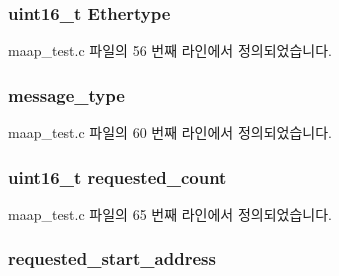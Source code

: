 \subsubsection[{\texorpdfstring{Ethertype}{Ethertype}}]{\setlength{\rightskip}{0pt plus 5cm}uint16\+\_\+t Ethertype}\hypertarget{structmaap__packet_a1a9102ebc02a8e42299ec477781088cd}{}\label{structmaap__packet_a1a9102ebc02a8e42299ec477781088cd}


maap\+\_\+test.\+c 파일의 56 번째 라인에서 정의되었습니다.

\subsubsection[{\texorpdfstring{message\+\_\+type}{message_type}}]{ message\+\_\+type}\hypertarget{structmaap__packet_aeaaffeace8c23899e558022f62ce6de4}{}\label{structmaap__packet_aeaaffeace8c23899e558022f62ce6de4}


maap\+\_\+test.\+c 파일의 60 번째 라인에서 정의되었습니다.

\subsubsection[{\texorpdfstring{requested\+\_\+count}{requested_count}}]{\setlength{\rightskip}{0pt plus 5cm}uint16\+\_\+t requested\+\_\+count}\hypertarget{structmaap__packet_a3b7ca808f59412368434591249aa8a79}{}\label{structmaap__packet_a3b7ca808f59412368434591249aa8a79}


maap\+\_\+test.\+c 파일의 65 번째 라인에서 정의되었습니다.

\subsubsection[{\texorpdfstring{requested\+\_\+start\+\_\+address}{requested_start_address}}]{ requested\+\_\+start\+\_\+address}\hypertarget{structmaap__packet_a6e54c2881571f11a3a4a82c664794326}{}\label{structmaap__packet_a6e54c2881571f11a3a4a82c664794326}


